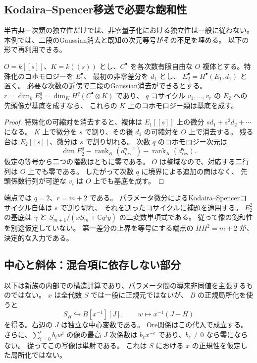 \subsection{Kodaira--Spencer移送で必要な飽和性}

半古典一次類の独立性だけでは、非零量子化における独立性は一般に従わない。
本例では、二段のGaussian消去と既知の次元等号がその不足を埋める。
以下の形で再利用できる。

\begin{lemma}[第一差分の上界が等号の場合の一次類移送]
$O=k[[s]]$、$K=k((s))$ とし、$C^\bullet$ を各次数有限自由な
$O$ 複体とする。特殊化のコホモロジーを $E_1^\bullet$、
最初の非零差分を $d_1$ とし、
$E_2^\bullet=H^\bullet(E_1,d_1)$ と置く。
必要な次数の近傍で二段のGaussian消去ができるとする。
$r=\dim_kE_2^q=\dim_KH^q(C^\bullet\otimes K)$ であり、
$q$ コサイクル $v_1,\ldots,v_r$ の $E_2$ への先頭像が基底を成すなら、
これらの $K$ 上のコホモロジー類は基底を成す。
\end{lemma}

\begin{proof}
特殊化の可縮対を消去すると、複体は
$E_1[[s]]$ 上の微分 $s d_1+s^2d_2+\cdots$ になる。
$K$ 上で微分を $s$ で割り、その後 $d_1$ の可縮対を $O$ 上で消去する。
残る台は $E_2[[s]]$、微分は $s$ で割り切れる。
次数 $q$ のコホモロジー次元は
\[
 \dim E_2^q-\operatorname{rank}_K(d^{q-1}_{\mathrm{res}})
              -\operatorname{rank}_K(d^q_{\mathrm{res}}).
\]
仮定の等号から二つの階数はともに零である。
$O$ は整域なので、対応する二行列は $O$ 上でも零である。
したがって次数 $q$ に境界による追加の商はなく、
先頭係数行列が可逆な $v_i$ は $O$ 上でも基底を成す。
\end{proof}

端点では $q=2$、$r=m+2$ である。
パラメータ微分によるKodaira--Spencerコサイクル自体は $s$ で割り切れ、
それを割ったコサイクルに補題を適用する。
$E_2^2$ の基底は $\gamma$ と
$S_{m+1}/(xS_m+\mathbb C q^jy)$ の二変数単項式である。
従って像の飽和性を別途仮定していない。
第一差分の上界を等号にする端点の $HH^2=m+2$ が、決定的な入力である。

\subsection{中心と斜体：混合項に依存しない部分}

以下は新族の内部での構造計算であり、パラメータ間の導来非同値を主張するものではない。
$x$ は全代数 $S$ では一般に正規元ではないが、
$B$ の正規局所化を使うと
\begin{equation}
\label{eq:notes-endpoint-local-embedding-v37}
 S_H\hookrightarrow B[x^{-1}][J],
 \qquad w\longmapsto x^{-1}(J-H)
\end{equation}
を得る。右辺の $J$ は独立な中心変数である。
Ore関係はこの代入で成立する。
さらに、$\sum_{i=0}^{e}b_iw^i$ の像の最高 $J$ 次係数は
$b_e x^{-e}$ であり、$b_e\ne0$ なら零にならない。
従ってこの写像は単射である。
これは $S$ における $x$ の正規性を仮定した局所化ではない。

